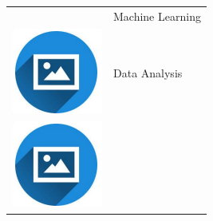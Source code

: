 \documentclass{article}
\begin{document}
\begin{paracol}{2}
\begin{tabular}{ll}
\begin{minipage}{0.1\linewidth}
         \end{minipage} & {{Machine Learning}} \\[10pt]
         \begin{minipage}{0.1\linewidth}
         \includegraphics[width=\linewidth]{picon.png}
         \end{minipage} & {{Data Analysis}} \\[10pt]
         \begin{minipage}{0.1\linewidth}
         \includegraphics[width=\linewidth]{picon.png}

\end{minipage}
\end{tabular}
\end{paracol}
\end{document}
